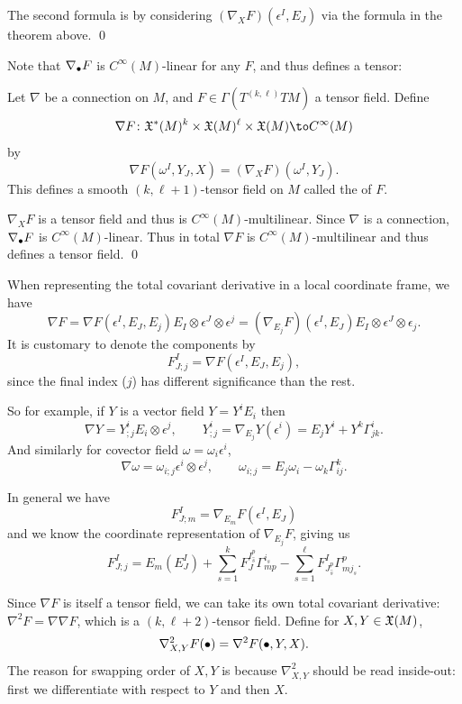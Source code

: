     The second formula is by considering $(\nabla_XF)(\epsilon^I,E_J)$ via the formula in the theorem above.
    \qed

\eproof

Note that $\nabla_\bullet F$ is $C^\infty(M)$-linear for any $F$, and thus defines a tensor:

\bprop

    Let $\nabla$ be a connection on $M$, and $F\in\Gamma(T^{(k,\ell)}TM)$ a tensor field.
    Define
    $$ \nabla F\colon\X^*(M)^k \times \X(M)^\ell \times \X(M) \to C^\infty(M) $$
    by
    $$ \nabla F(\omega^I,Y_J,X) = (\nabla_X F)(\omega^I,Y_J) . $$
    This defines a smooth $(k,\ell+1)$-tensor field on $M$ called the  of $F$.

\eprop

\bproof

    $\nabla_XF$ is a tensor field and thus is $C^\infty(M)$-multilinear.
    Since $\nabla$ is a connection, $\nabla_\bullet F$ is $C^\infty(M)$-linear.
    Thus in total $\nabla F$ is $C^\infty(M)$-multilinear and thus defines a tensor field.
    \qed

\eproof

When representing the total covariant derivative in a local coordinate frame, we have
$$ \nabla F = \nabla F(\epsilon^I,E_J,E_j)E_I\otimes\epsilon^J\otimes\epsilon^j =
(\nabla_{E_j}F)(\epsilon^I,E_J)E_I\otimes\epsilon^J\otimes\epsilon_j . $$
It is customary to denote the components by
$$ F^I_{J;j} = \nabla F(\epsilon^I,E_J,E_j) , $$
since the final index ($j$) has different significance than the rest.

So for example, if $Y$ is a vector field $Y=Y^iE_i$ then
$$ \nabla Y = Y^i_{;j}E_i\otimes\epsilon^j,\qquad Y^i_{;j} = \nabla_{E_j} Y(\epsilon^i) = E_jY^i + Y^k\Gamma^i_{jk} . $$
And similarly for covector field $\omega=\omega_i\epsilon^i$,
$$ \nabla\omega = \omega_{i;j}\epsilon^i\otimes\epsilon^j,\qquad \omega_{i;j} = E_j\omega_i - \omega_k\Gamma^k_{ij} . $$

In general we have
$$ F^I_{J;m} = \nabla_{E_m}F(\epsilon^I,E_J) $$
and we know the coordinate representation of $\nabla_{E_j}F$, giving us
$$ F^I_{J;j} = E_m(E^I_J) + \sum_{s=1}^k F^{I^p_{\hat s}}_J\Gamma^{i_s}_{mp} - \sum_{s=1}^\ell F^I_{J^p_{\hat s}}\Gamma^p_{mj_s} . $$

Since $\nabla F$ is itself a tensor field, we can take its own total covariant derivative: $\nabla^2 F=\nabla\nabla F$,
which is a $(k,\ell+2)$-tensor field.
Define for $X,Y\in{\frak X}(M)$,
$$ \nabla^2_{X,Y}F(\bullet) = \nabla^2 F(\bullet,Y,X) . $$
The reason for swapping order of $X,Y$ is because $\nabla^2_{X,Y}$ should be read inside-out: first we differentiate with respect to $Y$
and then $X$.

